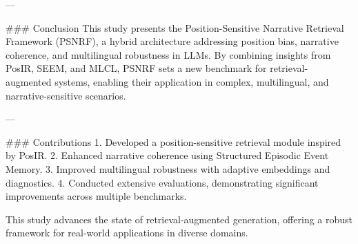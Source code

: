 ---

### Conclusion
This study presents the Position-Sensitive Narrative Retrieval Framework (PSNRF), a hybrid architecture addressing position bias, narrative coherence, and multilingual robustness in LLMs. By combining insights from PosIR, SEEM, and MLCL, PSNRF sets a new benchmark for retrieval-augmented systems, enabling their application in complex, multilingual, and narrative-sensitive scenarios.

---

### Contributions
1. Developed a position-sensitive retrieval module inspired by PosIR.
2. Enhanced narrative coherence using Structured Episodic Event Memory.
3. Improved multilingual robustness with adaptive embeddings and diagnostics.
4. Conducted extensive evaluations, demonstrating significant improvements across multiple benchmarks.

This study advances the state of retrieval-augmented generation, offering a robust framework for real-world applications in diverse domains.